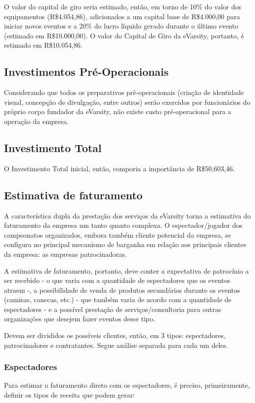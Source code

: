 \documentclass[a4paper, 12pt]{paper}
\begin{document}
O valor do capital de giro seria estimado, então, em torno de 10\% do valor dos equipamentos (R\$4.054,86), adicionados a um capital base de R\$4.000,00 para iniciar novos eventos e a 20\% do lucro líquido gerado durante o último evento (estimado em R\$10.000,00). O valor do Capital de Giro da eVarsity, portanto, é estimado em R\$10.054,86.
\subsection{Investimentos Pré-Operacionais}
Considerando que todos os preparativos pré-operacionais (criação de identidade visual, concepção de divulgação, entre outros) serão exercidos por funcionários do próprio corpo fundador da eVarsity, não existe custo pré-operacional para a operação da empresa.
\subsection{Investimento Total}
O Investimento Total inicial, então, comporia a importância de R\$50,603,46.
\subsection{Estimativa de faturamento}
A característica dupla da prestação dos serviços da eVarsity torna a estimativa do faturamento da empresa um tanto quanto complexa. O espectador/jogador dos campeonatos organizados, embora também cliente potencial da empresa, se configura no principal mecanismo de barganha em relação aos principais clientes da empresa: as empresas patrocinadoras.

A estimativa de faturamento, portanto, deve conter a expectativa de patrocínio a ser recebido - o que varia com a quantidade de espectadores que os eventos atraem -, a possibilidade de venda de produtos secundários durante os eventos (camisas, canecas, etc.) - que também varia de acordo com a quantidade de espectadores - e a possível prestação de serviços/consultoria para outras organizações que desejem fazer eventos desse tipo.

Devem ser divididos os possíveis clientes, então, em 3 tipos: espectadores, patrocinadores e contratantes. Segue análise separada para cada um deles.
\subsubsection{Espectadores}

Para estimar o faturamento direto com os espectadores, é preciso, primeiramente, definir os tipos de receita que podem gerar:
\end{document}
